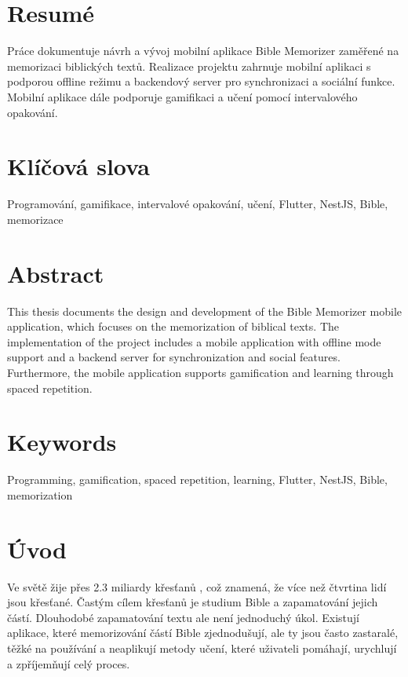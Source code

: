 \documentclass[12pt, a4paper, oneside]{article}
\begin{document}
	\section*{Resumé}
	Práce dokumentuje návrh a vývoj mobilní aplikace Bible Memorizer zaměřené na memorizaci biblických textů. Realizace projektu zahrnuje mobilní aplikaci s podporou offline režimu a backendový server pro synchronizaci a sociální funkce. Mobilní aplikace dále podporuje gamifikaci a učení pomocí intervalového opakování.
	
	
	\section*{Klíčová slova}
	Programování, gamifikace, intervalové opakování, učení, Flutter, NestJS, Bible, memorizace
	
	\section*{Abstract}
	This thesis documents the design and development of the Bible Memorizer mobile application, which focuses on the memorization of biblical texts. The implementation of the project includes a mobile application with offline mode support and a backend server for synchronization and social features. Furthermore, the mobile application supports gamification and learning through spaced repetition.
	
	\section*{Keywords}
	Programming, gamification, spaced repetition, learning, Flutter, NestJS, Bible, memorization
	
	\newpage
	\thispagestyle{empty}
	\tableofcontents
	
	
	\newpage
	\setcounter{page}{9}
	
	
	\section*{Úvod}
	Ve světě žije přes 2.3 miliardy křesťanů \cite{pocet-krestanu}, což znamená, že více než čtvrtina lidí jsou křesťané. Častým cílem křesťanů je studium Bible a zapamatování jejich částí.
	Dlouhodobé zapamatování textu ale není jednoduchý úkol.	Existují aplikace, které memorizování částí Bible zjednodušují, ale ty jsou často zastaralé, těžké na používání a neaplikují metody učení, které uživateli pomáhají, urychlují a zpříjemňují celý proces.
	
\end{document}
